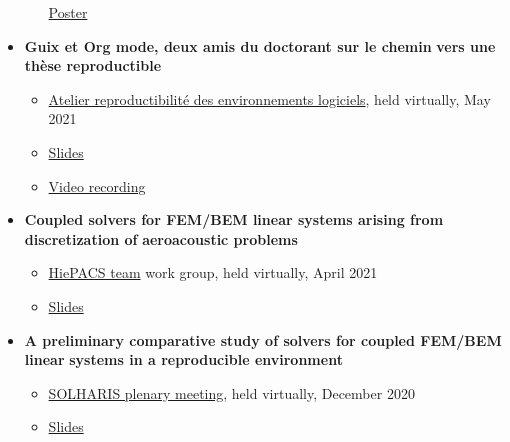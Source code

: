 \documentclass[a4paper, 11pt]{article}
\begin{document}
\begin{itemize}
\begin{itemize}
\begin{center}
\end{center}
\href{https://thesis-mfelsoci.gitlabpages.inria.fr/thesis/slides/poster-edmi-days.pdf}{Poster}
\end{itemize}
\item \begin{center}
\end{center} \textbf{Guix et Org mode, deux amis du doctorant sur le chemin}
\textbf{vers une thèse reproductible}
\begin{itemize}
\item \href{https://hpc.guix.info/events/2021/atelier-reproductibilit\%C3\%A9-environnements/}{Atelier
reproductibilité des environnements logiciels}, held virtually, May 2021
\item \begin{center}
\end{center}
\href{https://hpc.guix.info/static/doc/atelier-reproductibilit\%C3\%A9-2021/marek-fel\%C5\%A1\%C3\%B6ci-org-guix.pdf}{Slides}
\item \begin{center}
\end{center}
\href{https://hpc.guix.info/static/videos/atelier-reproductibilit\%C3\%A9-2021/marek-fel\%C5\%A1\%C3\%B6ci.webm}{Video
recording}
\end{itemize}
\item \textbf{Coupled solvers for FEM/BEM linear systems arising from discretization of}
\textbf{aeroacoustic problems}
\begin{itemize}
\item \href{https://team.inria.fr/hiepacs/}{HiePACS team} work group, held virtually,
April 2021
\item \begin{center}
\end{center}
\href{https://thesis-mfelsoci.gitlabpages.inria.fr/thesis/slides/wg-04-2021.pdf}{Slides}
\end{itemize}
\item \textbf{A preliminary comparative study of solvers for coupled FEM/BEM linear}
\textbf{systems in a reproducible environment}
\begin{itemize}
\item \href{https://www.irit.fr/solharis/solharis-plenary-meeting-07-08-12-2020/}{SOLHARIS
plenary meeting}, held virtually, December 2020
\item \begin{center}
\end{center}
\href{https://www.irit.fr/solharis/wp-content/uploads/2020/12/122020-Felsoci.pdf}{Slides}
\end{itemize}
\end{itemize}
\end{document}
